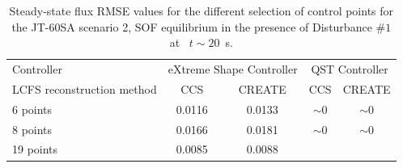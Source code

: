 \begin{table}[]
	\centering
	\begin{tabular}{|l|c|c|c|c|}
		\hline
		\rowcolor{color2}
		\multicolumn{5}{|c|}{\textbf{Disturbance $\#1$ flux RMSE steady state      ~ ~ Wb/2$\pi$}}                                                                 \\ \hline
		\rowcolor{color1}
		Controller                 & \multicolumn{2}{c|}{eXtreme Shape Controller} & \multicolumn{2}{c|}{QST Controller}                 \\ \hline
		LCFS reconstruction method & CCS                   & CREATE                & CCS                      & CREATE                   \\ \hline
		6 points                   & 0.0116                & 0.0133                & $\sim 0$               & $\sim 0$                  \\ \hline
		8 points                   & 0.0166                & 0.0181                & $\sim 0$                 & $\sim 0$                  \\ \hline
		19 points                  & 0.0085                & 0.0088                & \cellcolor[HTML]{C0C0C0} & \cellcolor[HTML]{C0C0C0} \\ \hline
	\end{tabular}
	\caption{Steady-state flux RMSE values for the different selection of control points for  the JT-60SA scenario 2, SOF equilibrium in the presence of  Disturbance $\# 1$  at ~$t\sim 20 $~s. }
	\label{fluxRMS_Urano_table}
\end{table}

